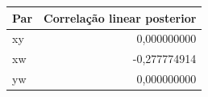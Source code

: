\begin{tabular}{lr}
\toprule
Par & Correlação linear posterior \\
\midrule
xy & 0,000000000 \\
xw & -0,277774914 \\
yw & 0,000000000 \\
\bottomrule
\end{tabular}
